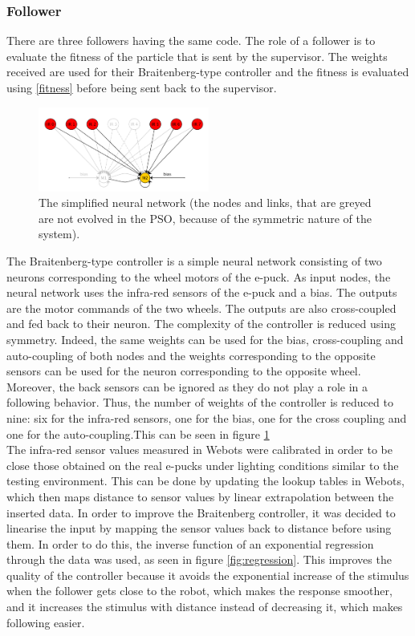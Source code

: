 \documentclass[a4paper, 10pt, conference]{ieeeconf}      %
\begin{document}
\subsubsection{Follower}
There are three followers having the same code. The role of a follower is to evaluate the fitness of the particle that is sent by the supervisor. The weights received are used for their Braitenberg-type controller and the fitness is evaluated using \ref{fitness} before being sent back to the supervisor.

\begin{figure}[thpb]
      \centering
      \includegraphics[width = 0.5\textwidth]{images/NNsimplified.png}
      \caption{The simplified neural network (the nodes and links, that are greyed are not evolved in the PSO, because of the symmetric nature of the system).}
      \label{fig:nnsimplified}
\end{figure}

The Braitenberg-type controller is a simple neural network consisting of two neurons corresponding to the wheel motors of the e-puck. As input nodes, the neural network uses the infra-red sensors of the e-puck  and a bias. The outputs are the motor commands of the two wheels. The outputs are also cross-coupled and fed back to their neuron. The complexity of the controller is reduced using symmetry. Indeed, the same weights can be used for the bias, cross-coupling and auto-coupling of both nodes and the weights corresponding to the opposite sensors can be used for the neuron corresponding to the opposite wheel. Moreover, the back sensors can be ignored as they do not play a role in a following behavior. Thus, the number of weights of the controller is reduced to nine: six for the infra-red sensors, one for the bias, one for the cross coupling and one for the auto-coupling.This can be seen in figure \ref{fig:nnsimplified}\\
The infra-red sensor values measured in Webots were calibrated in order to be close those obtained on the real e-pucks under lighting conditions similar to the testing environment. This can be done by updating the lookup tables in Webots, which then maps distance to sensor values by linear extrapolation between the inserted data. In order to improve the Braitenberg controller, it was decided to linearise the input by mapping the sensor values back to distance before using them. In order to do this, the inverse function of an exponential regression through the data was used, as seen in figure \ref{fig:regression}. This improves the quality of the controller because it avoids the exponential increase of the stimulus when the follower gets close to the robot, which makes the response smoother, and it increases the stimulus with distance instead of decreasing it, which makes following easier.\\
\end{document}
